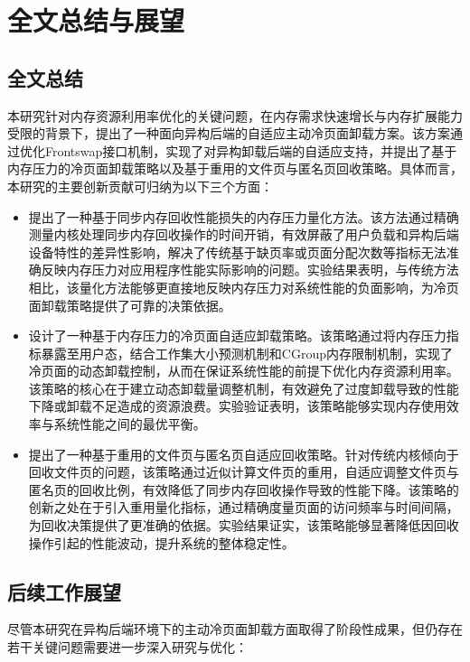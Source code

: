 \chapter{全文总结与展望}

\section{全文总结}
本研究针对内存资源利用率优化的关键问题，在内存需求快速增长与内存扩展能力受限的背景下，提出了一种面向异构后端的自适应主动冷页面卸载方案。该方案通过优化Frontswap接口机制，实现了对异构卸载后端的自适应支持，并提出了基于内存压力的冷页面卸载策略以及基于重用的文件页与匿名页回收策略。具体而言，本研究的主要创新贡献可归纳为以下三个方面：

\begin{itemize}
    \item 提出了一种基于同步内存回收性能损失的内存压力量化方法。该方法通过精确测量内核处理同步内存回收操作的时间开销，有效屏蔽了用户负载和异构后端设备特性的差异性影响，解决了传统基于缺页率或页面分配次数等指标无法准确反映内存压力对应用程序性能实际影响的问题。实验结果表明，与传统方法相比，该量化方法能够更直接地反映内存压力对系统性能的负面影响，为冷页面卸载策略提供了可靠的决策依据。

    \item 设计了一种基于内存压力的冷页面自适应卸载策略。该策略通过将内存压力指标暴露至用户态，结合工作集大小预测机制和CGroup内存限制机制，实现了冷页面的动态卸载控制，从而在保证系统性能的前提下优化内存资源利用率。该策略的核心在于建立动态卸载量调整机制，有效避免了过度卸载导致的性能下降或卸载不足造成的资源浪费。实验验证表明，该策略能够实现内存使用效率与系统性能之间的最优平衡。

    \item 提出了一种基于重用的文件页与匿名页自适应回收策略。针对传统内核倾向于回收文件页的问题，该策略通过近似计算文件页的重用，自适应调整文件页与匿名页的回收比例，有效降低了同步内存回收操作导致的性能下降。该策略的创新之处在于引入重用量化指标，通过精确度量页面的访问频率与时间间隔，为回收决策提供了更准确的依据。实验结果证实，该策略能够显著降低因回收操作引起的性能波动，提升系统的整体稳定性。

\end{itemize}

\section{后续工作展望}
尽管本研究在异构后端环境下的主动冷页面卸载方面取得了阶段性成果，但仍存在若干关键问题需要进一步深入研究与优化：

